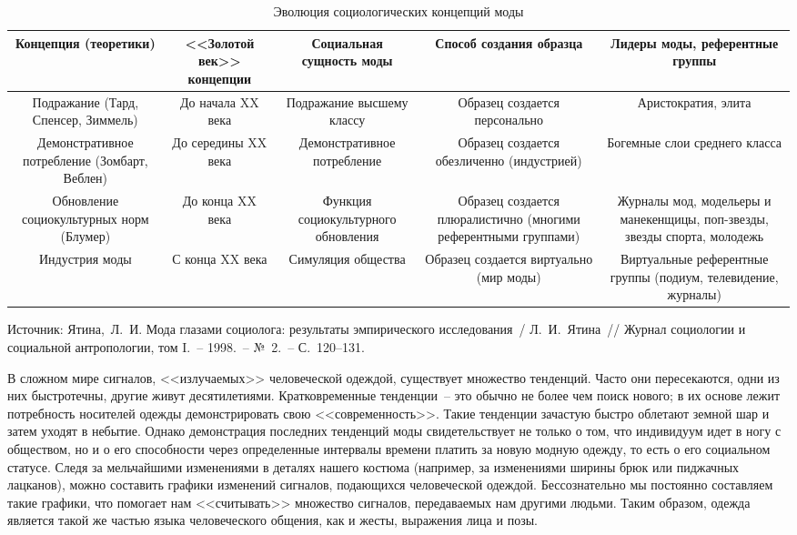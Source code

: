   \begin{table}[t!]
    \center
    \small
    \caption{Эволюция социологических концепций моды}
    \label{tab:1}
    \begin{tabular}{|*{2}{C{.2}|C{.15}|}C{.17}|} \hline
      Концепция (теоретики) & <<Золотой век>> концепции & Социальная сущность
        моды & Способ создания образца & Лидеры моды, референтные группы
        \\ \hline
      Подражание (Тард, Спенсер, Зиммель) & До начала XX века &
        Подражание высшему классу & Образец создается персонально &
        Аристократия, элита \\ \hline
      Демонстративное потребление (Зомбарт, Веблен) & До середины
        XX века & Демонстративное потребление & Образец создается
        обезличенно (индустрией) & Богемные слои среднего класса \\ \hline
      Обновление социокультурных норм (Блумер) & До конца XX века &
        Функция социокультурного обновления & Образец создается плюралистично
        (многими референтными группами) & Журналы мод, модельеры и манекенщицы,
        поп-звезды, звезды спорта, молодежь \\ \hline
      Индустрия моды & С конца XX века & Симуляция общества & Образец
        создается виртуально (мир моды) & Виртуальные референтные группы
        (подиум, телевидение, журналы) \\ \hline
    \end{tabular}
    
    \medskip
    Источник: Ятина,~Л.~И. Мода глазами социолога: результаты
      эмпирического исследования~/ Л.~И.~Ятина~// Журнал социологии и
      социальной антропологии, том I.~-- 1998.~-- №~2.~-- С.~120--131.
  \end{table}
  
  В сложном мире сигналов, <<излучаемых>> человеческой одеждой, существует
  множество тенденций. Часто они пересекаются, одни из них быстротечны, другие
  живут десятилетиями. Кратковременные тенденции~-- это обычно не более чем
  поиск нового; в их основе лежит потребность носителей одежды демонстрировать
  свою <<современность>>. Такие тенденции зачастую быстро облетают земной шар
  и затем уходят в небытие. Однако демонстрация последних тенденций моды
  свидетельствует не только о том, что индивидуум идет в ногу с обществом, но и
  о его способности через определенные интервалы времени платить за новую
  модную одежду, то есть о его социальном статусе. Следя за мельчайшими
  изменениями в деталях нашего костюма (например, за изменениями ширины брюк
  или пиджачных лацканов), можно составить графики изменений сигналов,
  подающихся человеческой одеждой. Бессознательно мы постоянно составляем такие
  графики, что помогает нам <<считывать>> множество сигналов, передаваемых нам
  другими людьми. Таким образом, одежда является такой же частью языка
  человеческого общения, как и жесты, выражения лица и позы.~\cite{bib:2}

